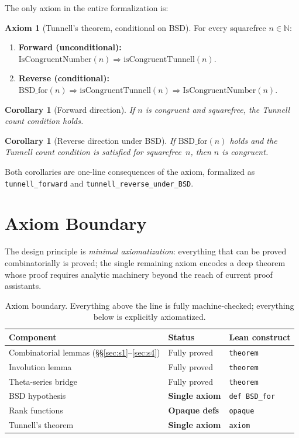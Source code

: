 \documentclass[11pt,a4paper]{article}
\newtheorem{corollary}[theorem]{Corollary}
\theoremstyle{definition}
\newtheorem{axiomenv}[theorem]{Axiom}
\newcommand{\N}{\mathbb{N}}
\newcommand{\lean}[1]{\texttt{#1}}
\newcommand{\BSDfor}{\mathrm{BSD\_for}}
\begin{document}
The only axiom in the entire formalization is:

\begin{axiomenv}[Tunnell's theorem, conditional on BSD]\label{ax:tunnell}
For every squarefree $n \in \N$:
\begin{enumerate}[nosep]
  \item \textbf{Forward (unconditional):}
    $\mathrm{IsCongruentNumber}(n) \Rightarrow
     \mathrm{isCongruentTunnell}(n)$.
  \item \textbf{Reverse (conditional):}
    $\BSDfor(n) \Rightarrow
     \mathrm{isCongruentTunnell}(n) \Rightarrow
     \mathrm{IsCongruentNumber}(n)$.
\end{enumerate}
\end{axiomenv}

\begin{corollary}[Forward direction]\label{cor:forward}
If $n$ is congruent and squarefree, the Tunnell count condition holds.
\end{corollary}

\begin{corollary}[Reverse direction under BSD]\label{cor:reverse}
If $\BSDfor(n)$ holds and the Tunnell count condition is satisfied
for squarefree~$n$, then $n$ is congruent.
\end{corollary}

Both corollaries are one-line consequences of the axiom, formalized
as \lean{tunnell\_forward} and \lean{tunnell\_reverse\_under\_BSD}.

\section{Axiom Boundary}\label{sec:boundary}

The design principle is \emph{minimal axiomatization}: everything
that can be proved combinatorially is proved; the single remaining
axiom encodes a deep theorem whose proof requires analytic machinery
beyond the reach of current proof assistants.

\begin{table}[ht]
\centering
\begin{tabular}{@{}lll@{}}
\toprule
\textbf{Component} & \textbf{Status} & \textbf{Lean construct} \\
\midrule
Combinatorial lemmas (\S\S\ref{sec:s1}--\ref{sec:s4})
  & Fully proved & \lean{theorem} \\
Involution lemma
  & Fully proved & \lean{theorem} \\
Theta-series bridge
  & Fully proved & \lean{theorem} \\
BSD hypothesis
  & \textbf{Single axiom} & \lean{def BSD\_for} \\
Rank functions
  & \textbf{Opaque defs} & \lean{opaque} \\
Tunnell's theorem
  & \textbf{Single axiom} & \lean{axiom} \\
\bottomrule
\end{tabular}
\caption{Axiom boundary.  Everything above the line is fully
machine-checked; everything below is explicitly axiomatized.}
\label{tab:boundary}
\end{table}
\end{document}
